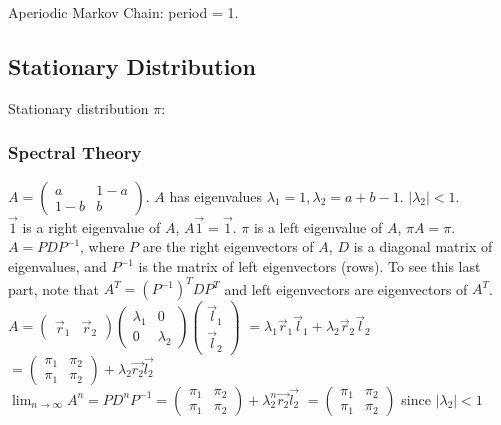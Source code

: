 \documentclass{article}
\begin{document}
Aperiodic Markov Chain: period = 1.


\subsection{Stationary Distribution}
Stationary distribution $\pi$: 

\subsubsection{Spectral Theory}
$A = \begin{pmatrix}
a & 1-a \\ 
1-b & b
\end{pmatrix}$.
$A$ has eigenvalues $\lambda_1 = 1, \lambda_2 = a+b-1$. $|\lambda_2| < 1$.\\

$\vec{1}$ is a right eigenvalue of $A$, $A \vec{1} = \vec{1}$. $\pi$ is a left eigenvalue of $A$, $\pi A = \pi$. \\

$A = P D P^{-1}$, where $P$ are the right eigenvectors of $A$, $D$ is a diagonal matrix of eigenvalues, and $P^{-1}$ is the matrix of left eigenvectors (rows). To see this last part, note that $A^T = (P^{-1})^T D P^T$ and left eigenvectors are eigenvectors of $A^T$. \\

$A = \begin{pmatrix}\vec{r}_1 & \vec{r}_2\end{pmatrix} \begin{pmatrix}\lambda_1 & 0 \\ 0 & \lambda_2\end{pmatrix} \begin{pmatrix}\vec{l}_1 \\ \vec{l}_2\end{pmatrix}$
$= \lambda_1 \vec{r}_1 \vec{l}_1 + \lambda_2 \vec{r}_2 \vec{l}_2$
$=\begin{pmatrix} \pi_1 & \pi_2 \\ \pi_1 & \pi_2 \end{pmatrix} + \lambda_2 \vec{r_2}\vec{l_2}$ \\

$\lim_{n\to\infty} A^n = P D^n P^{-1} = \begin{pmatrix} \pi_1 & \pi_2 \\ \pi_1 & \pi_2 \end{pmatrix} + \lambda_2^n \vec{r_2}\vec{l_2}$
$= \begin{pmatrix} \pi_1 & \pi_2 \\ \pi_1 & \pi_2 \end{pmatrix}$
since $|\lambda_2| < 1$
\end{document}
